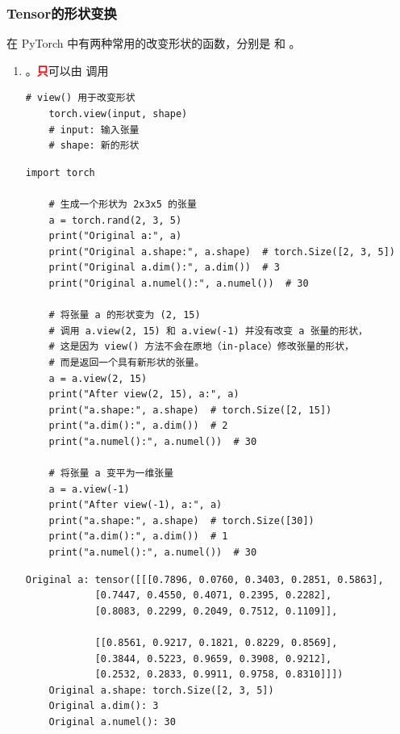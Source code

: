 \subsubsection{Tensor的形状变换}
\label{subsubsec:Pytorch的Tensor的形状变换}
在 PyTorch 中有两种常用的改变形状的函数，分别是  和 。
\begin{enumerate}[label=\arabic*)]
    \item {}
    。\textcolor{red}{\textbf{只}}可以由  调用
    \begin{lstlisting}[style=demostyle,numbers=none]
    # view() 用于改变形状
    torch.view(input, shape)
    # input: 输入张量
    # shape: 新的形状
    \end{lstlisting}
    
    \begin{lstlisting}[style=pythonstyle]
    import torch

    # 生成一个形状为 2x3x5 的张量
    a = torch.rand(2, 3, 5)
    print("Original a:", a)
    print("Original a.shape:", a.shape)  # torch.Size([2, 3, 5])
    print("Original a.dim():", a.dim())  # 3
    print("Original a.numel():", a.numel())  # 30
    
    # 将张量 a 的形状变为 (2, 15)
    # 调用 a.view(2, 15) 和 a.view(-1) 并没有改变 a 张量的形状，
    # 这是因为 view() 方法不会在原地（in-place）修改张量的形状，
    # 而是返回一个具有新形状的张量。
    a = a.view(2, 15)
    print("After view(2, 15), a:", a)
    print("a.shape:", a.shape)  # torch.Size([2, 15])
    print("a.dim():", a.dim())  # 2
    print("a.numel():", a.numel())  # 30
    
    # 将张量 a 变平为一维张量
    a = a.view(-1)
    print("After view(-1), a:", a)
    print("a.shape:", a.shape)  # torch.Size([30])
    print("a.dim():", a.dim())  # 1
    print("a.numel():", a.numel())  # 30
    \end{lstlisting}
    \begin{lstlisting}[style=demostyle,numbers=none]
    Original a: tensor([[[0.7896, 0.0760, 0.3403, 0.2851, 0.5863],
            [0.7447, 0.4550, 0.4071, 0.2395, 0.2282],
            [0.8083, 0.2299, 0.2049, 0.7512, 0.1109]],

            [[0.8561, 0.9217, 0.1821, 0.8229, 0.8569],
            [0.3844, 0.5223, 0.9659, 0.3908, 0.9212],
            [0.2532, 0.2833, 0.9911, 0.9758, 0.8310]]])
    Original a.shape: torch.Size([2, 3, 5])
    Original a.dim(): 3
    Original a.numel(): 30


\end{lstlisting}
\end{enumerate}

